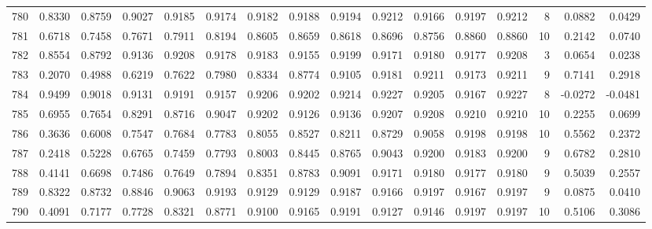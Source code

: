 \begin{tabular}{lrrrrrrrrrrrrrrr}
780 &      0.8330 &  0.8759 &  0.9027 &  0.9185 &  0.9174 &  0.9182 &  0.9188 &  0.9194 &  0.9212 &  0.9166 &   0.9197 &     0.9212 &      8 &                    0.0882 &                     0.0429 \\
781 &      0.6718 &  0.7458 &  0.7671 &  0.7911 &  0.8194 &  0.8605 &  0.8659 &  0.8618 &  0.8696 &  0.8756 &   0.8860 &     0.8860 &     10 &                    0.2142 &                     0.0740 \\
782 &      0.8554 &  0.8792 &  0.9136 &  0.9208 &  0.9178 &  0.9183 &  0.9155 &  0.9199 &  0.9171 &  0.9180 &   0.9177 &     0.9208 &      3 &                    0.0654 &                     0.0238 \\
783 &      0.2070 &  0.4988 &  0.6219 &  0.7622 &  0.7980 &  0.8334 &  0.8774 &  0.9105 &  0.9181 &  0.9211 &   0.9173 &     0.9211 &      9 &                    0.7141 &                     0.2918 \\
784 &      0.9499 &  0.9018 &  0.9131 &  0.9191 &  0.9157 &  0.9206 &  0.9202 &  0.9214 &  0.9227 &  0.9205 &   0.9167 &     0.9227 &      8 &                   -0.0272 &                    -0.0481 \\
785 &      0.6955 &  0.7654 &  0.8291 &  0.8716 &  0.9047 &  0.9202 &  0.9126 &  0.9136 &  0.9207 &  0.9208 &   0.9210 &     0.9210 &     10 &                    0.2255 &                     0.0699 \\
786 &      0.3636 &  0.6008 &  0.7547 &  0.7684 &  0.7783 &  0.8055 &  0.8527 &  0.8211 &  0.8729 &  0.9058 &   0.9198 &     0.9198 &     10 &                    0.5562 &                     0.2372 \\
787 &      0.2418 &  0.5228 &  0.6765 &  0.7459 &  0.7793 &  0.8003 &  0.8445 &  0.8765 &  0.9043 &  0.9200 &   0.9183 &     0.9200 &      9 &                    0.6782 &                     0.2810 \\
788 &      0.4141 &  0.6698 &  0.7486 &  0.7649 &  0.7894 &  0.8351 &  0.8783 &  0.9091 &  0.9171 &  0.9180 &   0.9177 &     0.9180 &      9 &                    0.5039 &                     0.2557 \\
789 &      0.8322 &  0.8732 &  0.8846 &  0.9063 &  0.9193 &  0.9129 &  0.9129 &  0.9187 &  0.9166 &  0.9197 &   0.9167 &     0.9197 &      9 &                    0.0875 &                     0.0410 \\
790 &      0.4091 &  0.7177 &  0.7728 &  0.8321 &  0.8771 &  0.9100 &  0.9165 &  0.9191 &  0.9127 &  0.9146 &   0.9197 &     0.9197 &     10 &                    0.5106 &                     0.3086 \\

\end{tabular}
